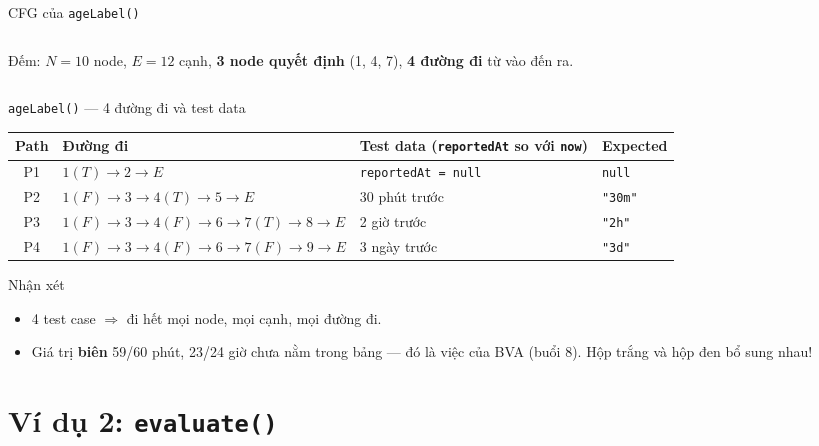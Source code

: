 \documentclass[aspectratio=169,12pt]{beamer}
\begin{document}
\begin{frame}[shrink=8]{CFG của \texttt{ageLabel()}}
\begin{columns}
    \vspace{0.4em}
    \small Đếm: $N = 10$ node, $E = 12$ cạnh,
    \textbf{3 node quyết định} (1, 4, 7), \textbf{4 đường đi} từ vào đến ra.
  \end{columns}
\end{frame}

\begin{frame}[shrink=5]{\texttt{ageLabel()} --- 4 đường đi và test data}
  \small
  \renewcommand{\arraystretch}{1.3}
  \begin{tabularx}{\textwidth}{clXl}
    \toprule
    \textbf{Path} & \textbf{Đường đi} & \textbf{Test data (\texttt{reportedAt} so với \texttt{now})} & \textbf{Expected} \\
    \midrule
    P1 & $1(T){\to}2{\to}E$ & \texttt{reportedAt = null} & \texttt{null} \\
    P2 & $1(F){\to}3{\to}4(T){\to}5{\to}E$ & 30 phút trước & \texttt{"30m"} \\
    P3 & $1(F){\to}3{\to}4(F){\to}6{\to}7(T){\to}8{\to}E$ & 2 giờ trước & \texttt{"2h"} \\
    P4 & $1(F){\to}3{\to}4(F){\to}6{\to}7(F){\to}9{\to}E$ & 3 ngày trước & \texttt{"3d"} \\
    \bottomrule
  \end{tabularx}
  \renewcommand{\arraystretch}{1}

  \vspace{0.5em}
  \begin{block}{Nhận xét}
    \begin{itemize}
      \item 4 test case $\Rightarrow$ đi hết mọi node, mọi cạnh, mọi đường đi.
      \item Giá trị \textbf{biên} 59/60 phút, 23/24 giờ chưa nằm trong bảng ---
        đó là việc của BVA (buổi 8). Hộp trắng và hộp đen bổ sung nhau!
    \end{itemize}
  \end{block}
\end{frame}

\section{Ví dụ 2: \texttt{evaluate()}}
\end{document}
